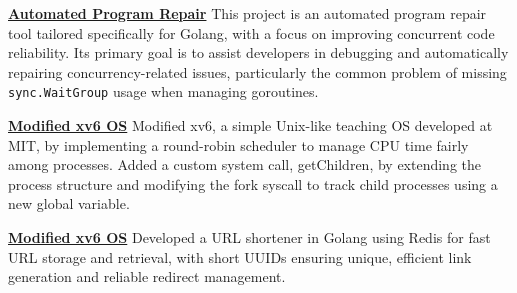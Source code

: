 
\begin{cvparagraph}

    \href{https://github.com/99pouria/automated-program-repair-for-golang?tab=readme-ov-file#automated-program-repair-for-golang}{\faGithubSquare \textbf{ Automated Program Repair}}
    \vspace{0.1cm}
    \newline
    {This project is an automated program repair tool tailored specifically for Golang, with a focus on improving concurrent code reliability. Its primary goal is to assist developers in debugging and automatically repairing concurrency-related issues, particularly the common problem of missing \texttt{sync.WaitGroup} usage when managing goroutines.}
    \vspace{0.2cm}

    \href{https://github.com/99pouria/XV6}{\faGithubSquare \textbf{ Modified xv6 OS}}
    \vspace{0.1cm}
    \newline
    {Modified xv6, a simple Unix-like teaching OS developed at MIT, by implementing a round-robin scheduler to manage CPU time fairly among processes. Added a custom system call, getChildren, by extending the process structure and modifying the fork syscall to track child processes using a new global variable.}
    \vspace{0.2cm}

    \href{https://github.com/99pouria/url-shortener?tab=readme-ov-file#url-shortener}{\faGithubSquare \textbf{ Modified xv6 OS}}
    \vspace{0.1cm}
    \newline
    {Developed a URL shortener in Golang using Redis for fast URL storage and retrieval, with short UUIDs ensuring unique, efficient link generation and reliable redirect management.}

\end{cvparagraph}
